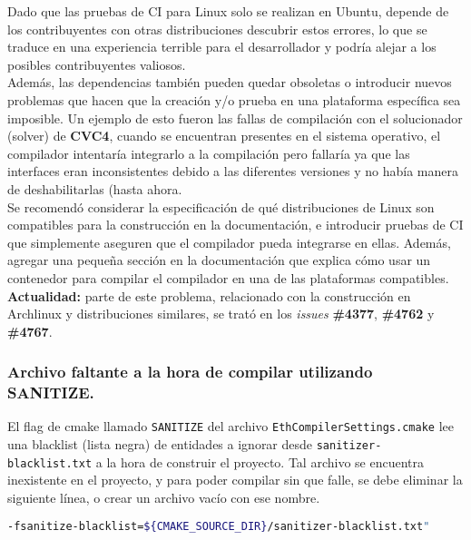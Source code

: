 Dado que las pruebas de CI para Linux solo se realizan en Ubuntu, depende de los contribuyentes con otras distribuciones descubrir estos errores, lo que se traduce en una experiencia terrible para el desarrollador y podría alejar a los posibles contribuyentes valiosos.\\

Además, las dependencias también pueden quedar obsoletas o introducir nuevos problemas que hacen que la creación y/o prueba en una plataforma específica sea imposible. Un ejemplo de esto fueron las fallas de compilación con el solucionador (solver) de \textbf{CVC4}, cuando se encuentran presentes en el sistema operativo, el compilador intentaría integrarlo a la compilación pero fallaría ya que las interfaces eran inconsistentes debido a las diferentes versiones y no había manera de deshabilitarlas (hasta ahora\cite{GHPR4767}.\\

Se recomendó considerar la especificación de qué distribuciones de Linux son compatibles para la construcción en la documentación, e introducir pruebas de CI que simplemente aseguren que el compilador pueda integrarse en ellas. Además, agregar una pequeña sección en la documentación que explica cómo usar un contenedor para compilar el compilador en una de las plataformas compatibles.\\

\textbf{Actualidad:} parte de este problema, relacionado con la construcción en Archlinux y distribuciones similares, se trató en los \textit{issues} \textbf{\#4377}\cite{GHI4377}, \textbf{\#4762}\cite{GHI4762} y \textbf{\#4767}\cite{GHI4767}.


\subsubsection{Archivo faltante a la hora de compilar utilizando SANITIZE.}

El flag de cmake llamado \verb|SANITIZE| del archivo \verb|EthCompilerSettings.cmake|\cite{SolidityEthCompilerSettings} lee una blacklist (lista negra) de entidades a ignorar desde \verb|sanitizer-blacklist.txt|  a la hora de construir el proyecto. Tal archivo se encuentra inexistente en el proyecto, y para poder compilar sin que falle, se debe eliminar la siguiente línea, o crear un archivo vacío con ese nombre.

\begin{lstlisting}[language=bash]
-fsanitize-blacklist=${CMAKE_SOURCE_DIR}/sanitizer-blacklist.txt"
\end{lstlisting}

